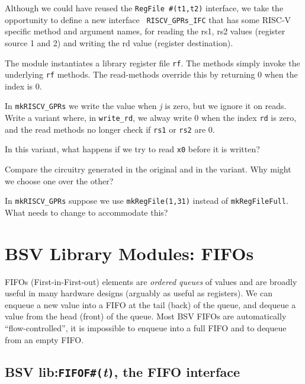 Although we could have reused the {\tt RegFile \#(t1,t2)} interface,
we take the opportunity to define a new interface {\tt
RISCV\_GPRs\_IFC} that has some RISC-V specific method and argument
names, for reading the rs1, rs2 values (register source 1 and 2) and
writing the rd value (register destination).

The module instantiates a library register file {\tt rf}.  The methods
simply invoke the underlying {\tt rf} methods.  The read-methods
override this by returning 0 when the index is 0.

\hdivider

\Exercise
\hm In {\tt mkRISCV\_GPRs} we write the value when \emph{j} is zero,
but we ignore it on reads.  Write a variant where, in {\tt write\_rd},
we alway write 0 when the index {\tt rd} is zero, and the read methods
no longer check if {\tt rs1} or {\tt rs2} are 0.

In this variant, what happens if we try to read {\tt x0} before it is
written?

Compare the circuitry generated in the original and in the variant.
Why might we choose one over the other?

\Exercise
\hm In {\tt mkRISCV\_GPRs} suppose we use {\tt mkRegFile(1,31)} instead of
{\tt mkRegFileFull}.  What needs to change to accommodate this?

\Endexercise


\section{BSV Library Modules: FIFOs}


FIFOs (First-in-First-out) elements are \emph{ordered queues} of
values and are broadly useful in many hardware designs (arguably as
useful as registers).  We can enqueue a new value into a FIFO at the
tail (back) of the queue, and dequeue a value from the head (front) of
the queue.  Most BSV FIFOs are automatically ``flow-controlled'',
{\ie} it is impossible to enqueue into a full FIFO and to dequeue from
an empty FIFO.


\subsection{BSV lib:{\tt FIFOF\#(}\emph{t}{\tt )}, the FIFO interface}

